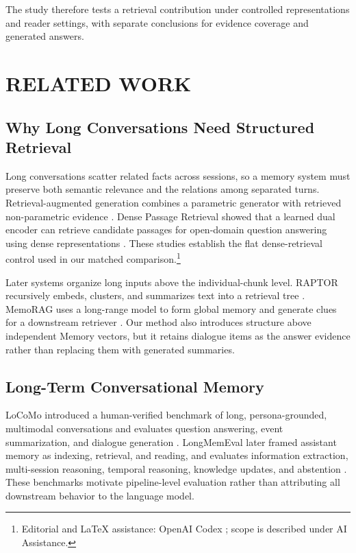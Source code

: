 \documentclass[a4paper,twoside]{article}
\newcommand{\aiedit}{\footnote{Editorial and \LaTeX{} assistance: OpenAI Codex
\cite{openai2026codex}; scope is described under AI Assistance.}}
\begin{document}
The study therefore tests a retrieval contribution under controlled
representations and reader settings, with separate conclusions for evidence
coverage and generated answers.

\section{\uppercase{Related Work}}

\subsection{Why Long Conversations Need Structured Retrieval}

Long conversations scatter related facts across sessions, so a memory system
must preserve both semantic relevance and the relations among separated
turns. Retrieval-augmented generation combines a parametric generator with retrieved
non-parametric evidence \cite{lewis2020rag}. Dense Passage Retrieval showed
that a learned dual encoder can retrieve candidate passages for open-domain
question answering using dense representations
\cite{karpukhin2020dpr}. These studies establish the flat dense-retrieval
control used in our matched comparison.\aiedit{}

Later systems organize long inputs above the individual-chunk level. RAPTOR
recursively embeds, clusters, and summarizes text into a retrieval tree
\cite{sarthi2024raptor}. MemoRAG uses a long-range model to form global memory
and generate clues for a downstream retriever \cite{qian2024memorag}. Our
method also introduces structure above independent Memory vectors, but it
retains dialogue items as the answer evidence rather than replacing them with
generated summaries.

\subsection{Long-Term Conversational Memory}

LoCoMo introduced a human-verified benchmark of long, persona-grounded,
multimodal conversations and evaluates question answering, event
summarization, and dialogue generation \cite{maharana2024locomo}.
LongMemEval later framed assistant memory as indexing, retrieval, and reading,
and evaluates information extraction, multi-session reasoning, temporal
reasoning, knowledge updates, and abstention \cite{wu2025longmemeval}. These
benchmarks motivate pipeline-level evaluation rather than attributing all
downstream behavior to the language model.
\end{document}

